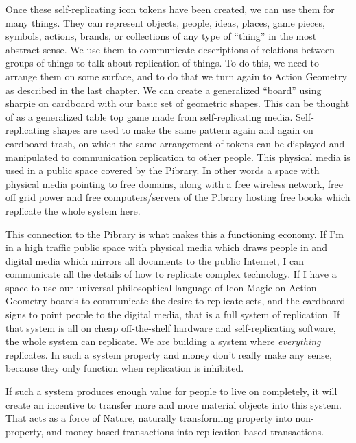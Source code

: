 Once these self-replicating icon tokens have been created, we can use
them for many things. They can represent objects, people, ideas, places,
game pieces, symbols, actions, brands, or collections of any type of
``thing'' in the most abstract sense. We use them to communicate
descriptions of relations between groups of things to talk about
replication of things. To do this, we need to arrange them on some
surface, and to do that we turn again to Action Geometry as described in
the last chapter. We can create a generalized ``board'' using sharpie on
cardboard with our basic set of geometric shapes. This can be thought of
as a generalized table top game made from self-replicating media.
Self-replicating shapes are used to make the same pattern again and
again on cardboard trash, on which the same arrangement of tokens can be
displayed and manipulated to communication replication to other people.
This physical media is used in a public space covered by the Pibrary. In
other words a space with physical media pointing to free domains, along
with a free wireless network, free off grid power and free
computers/servers of the Pibrary hosting free books which replicate the
whole system here.

This connection to the Pibrary is what makes this a functioning economy.
If I'm in a high traffic public space with physical media which draws
people in and digital media which mirrors all documents to the public
Internet, I can communicate all the details of how to replicate complex
technology. If I have a space to use our universal philosophical
language of Icon Magic on Action Geometry boards to communicate the
desire to replicate sets, and the cardboard signs to point people to the
digital media, that is a full system of replication. If that system is
all on cheap off-the-shelf hardware and self-replicating software, the
whole system can replicate. We are building a system where
\emph{everything} replicates. In such a system property and money don't
really make any sense, because they only function when replication is
inhibited.

If such a system produces enough value for people to live on completely,
it will create an incentive to transfer more and more material objects
into this system. That acts as a force of Nature, naturally transforming
property into non-property, and money-based transactions into
replication-based transactions.

